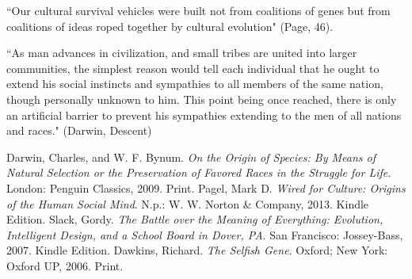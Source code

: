 \documentclass[11pt, oneside]{article}
\begin{document}
``Our cultural survival vehicles were built not from coalitions of genes but from coalitions of ideas roped together by cultural evolution" (Page, 46).

``As man advances in civilization, and small tribes are united into larger communities, the simplest reason would tell each individual that he ought to extend his social instincts and sympathies to all members of the same nation, though personally unknown to him. This point being once reached, there is only an artificial barrier to prevent his sympathies extending to the men of all nations and races." (Darwin, Descent)

\begin{thebibliography}{9}
	Darwin, Charles, and W. F. Bynum.
	\emph{On the Origin of Species: By Means of Natural Selection or the Preservation of Favored Races in the Struggle for Life}.
	London: Penguin Classics, 2009.
	Print.
	Pagel, Mark D. 
	\emph{Wired for Culture: Origins of the Human Social Mind}. 
	N.p.: W. W. Norton \& Company, 2013. 
	Kindle Edition. 
	Slack, Gordy. 
	\emph{The Battle over the Meaning of Everything: Evolution, Intelligent Design, and a School Board in Dover, PA}.
	San Francisco: Jossey-Bass, 2007. 
	Kindle Edition.
	Dawkins, Richard. 
	\emph{The Selfish Gene}.
	Oxford; New York: Oxford UP, 2006. 
	Print.
\end{thebibliography}
\end{document}
